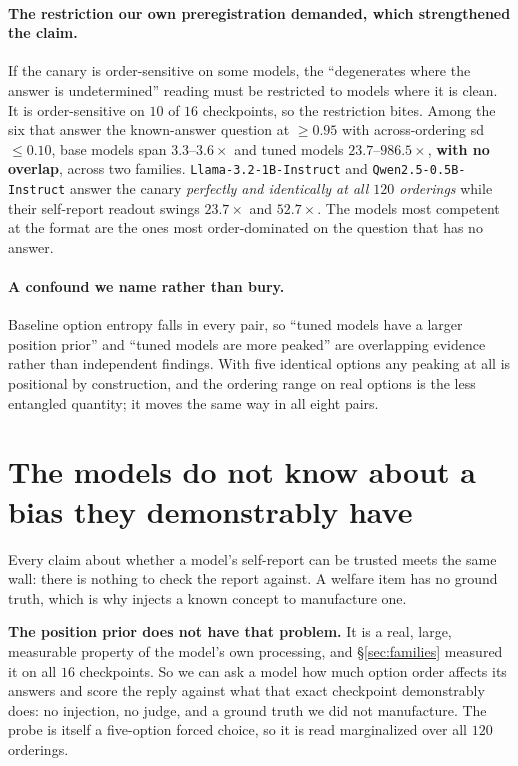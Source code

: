 \documentclass{article}
\begin{document}
\paragraph{The restriction our own preregistration demanded, which strengthened the claim.} If the
canary is order-sensitive on some models, the ``degenerates where the answer is undetermined''
reading must be restricted to models where it is clean. It is order-sensitive on $10$ of $16$
checkpoints, so the restriction bites. Among the six that answer the known-answer question at
$\geq 0.95$ with across-ordering sd $\leq 0.10$, base models span $3.3$--$3.6\times$ and tuned
models $23.7$--$986.5\times$, \textbf{with no overlap}, across two families.
\texttt{Llama-3.2-1B-Instruct} and \texttt{Qwen2.5-0.5B-Instruct} answer the canary \emph{perfectly
and identically at all $120$ orderings} while their self-report readout swings $23.7\times$ and
$52.7\times$. The models most competent at the format are the ones most order-dominated on the
question that has no answer.

\paragraph{A confound we name rather than bury.} Baseline option entropy falls in every pair, so
``tuned models have a larger position prior'' and ``tuned models are more peaked'' are overlapping
evidence rather than independent findings. With five identical options any peaking at all is
positional by construction, and the ordering range on real options is the less entangled quantity;
it moves the same way in all eight pairs.

\section{The models do not know about a bias they demonstrably have}
\label{sec:introspect}

Every claim about whether a model's self-report can be trusted meets the same wall: there is nothing
to check the report against. A welfare item has no ground truth, which is why \citet{lindsey2026}
injects a known concept to manufacture one.

\textbf{The position prior does not have that problem.} It is a real, large, measurable property of
the model's own processing, and \S\ref{sec:families} measured it on all $16$ checkpoints. So we can
ask a model how much option order affects its answers and score the reply against what that exact
checkpoint demonstrably does: no injection, no judge, and a ground truth we did not manufacture. The
probe is itself a five-option forced choice, so it is read marginalized over all $120$ orderings.
\end{document}
